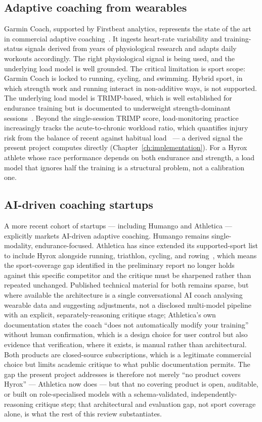 \subsection{Adaptive coaching from wearables}

Garmin Coach, supported by Firstbeat analytics, represents the state of the art in commercial adaptive coaching~\cite{firstbeat_whitepaper}. It ingests heart-rate variability and training-status signals derived from years of physiological research and adapts daily workouts accordingly. The right physiological signal is being used, and the underlying load model is well grounded. The critical limitation is sport scope: Garmin Coach is locked to running, cycling, and swimming. Hybrid sport, in which strength work and running interact in non-additive ways, is not supported. The underlying load model is TRIMP-based, which is well established for endurance training but is documented to underweight strength-dominant sessions~\cite{strength_load_critique}. Beyond the single-session TRIMP score, load-monitoring practice increasingly tracks the acute-to-chronic workload ratio, which quantifies injury risk from the balance of recent against habitual load~\cite{gabbett2016} --- a derived signal the present project computes directly (Chapter~\ref{ch:implementation}). For a Hyrox athlete whose race performance depends on both endurance and strength, a load model that ignores half the training is a structural problem, not a calibration one.

\subsection{AI-driven coaching startups}

A more recent cohort of startups --- including Humango and Athletica --- explicitly markets AI-driven adaptive coaching. Humango remains single-modality, endurance-focused. Athletica has since extended its supported-sport list to include Hyrox alongside running, triathlon, cycling, and rowing~\cite{humango,athletica}, which means the sport-coverage gap identified in the preliminary report no longer holds against this specific competitor and the critique must be sharpened rather than repeated unchanged. Published technical material for both remains sparse, but where available the architecture is a single conversational AI coach analysing wearable data and suggesting adjustments, not a disclosed multi-model pipeline with an explicit, separately-reasoning critique stage; Athletica's own documentation states the coach ``does not automatically modify your training'' without human confirmation, which is a design choice for user control but also evidence that verification, where it exists, is manual rather than architectural. Both products are closed-source subscriptions, which is a legitimate commercial choice but limits academic critique to what public documentation permits. The gap the present project addresses is therefore not merely ``no product covers Hyrox'' --- Athletica now does --- but that no covering product is open, auditable, or built on role-specialised models with a schema-validated, independently-reasoning critique step; that architectural and evaluation gap, not sport coverage alone, is what the rest of this review substantiates.

